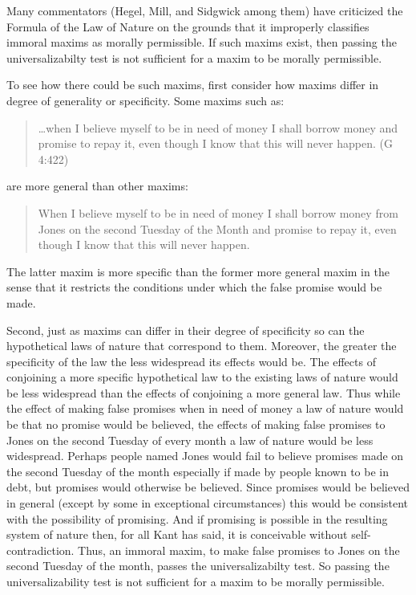 Many commentators (Hegel, Mill, and Sidgwick among them) have criticized the Formula of the Law of Nature on the grounds that it improperly classifies immoral maxims as morally permissible. If such maxims exist, then passing the universalizabilty test is not sufficient for a maxim to be morally permissible.

To see how there could be such maxims, first consider how maxims differ in degree of generality or specificity. Some maxims such as:
\begin{quote}
	\ldots when I believe myself to be in need of money I shall borrow money and promise to repay it, even though I know that this will never happen. (G 4:422)
\end{quote}
are more general than other maxims:
\begin{quote}
	When I believe myself to be in need of money I shall borrow money from Jones on the second Tuesday of the Month and promise to repay it, even though I know that this will never happen.
\end{quote}

The latter maxim is more specific than the former more general maxim in the sense that it restricts the conditions under which the false promise would be made.

Second, just as maxims can differ in their degree of specificity so can the hypothetical laws of nature that correspond to them. Moreover, the greater the specificity of the law the less widespread its effects would be. The effects of conjoining a more specific hypothetical law to the existing laws of nature would be less widespread than the effects of conjoining a more general law. Thus while the effect of making false promises when in need of money a law of nature would be that no promise would be believed, the effects of making false promises to Jones on the second Tuesday of every month a law of nature would be less widespread. Perhaps people named Jones would fail to believe promises made on the second Tuesday of the month especially if made by people known to be in debt, but promises would otherwise be believed. Since promises would be believed in general (except by some in exceptional circumstances) this would be consistent with the possibility of promising. And if promising is possible in the resulting system of nature then, for all Kant has said, it is conceivable without self-contradiction. Thus, an immoral maxim, to make false promises to Jones on the second Tuesday of the month, passes the universalizabilty test. So passing the universalizability test is not sufficient for a maxim to be morally permissible. \change

